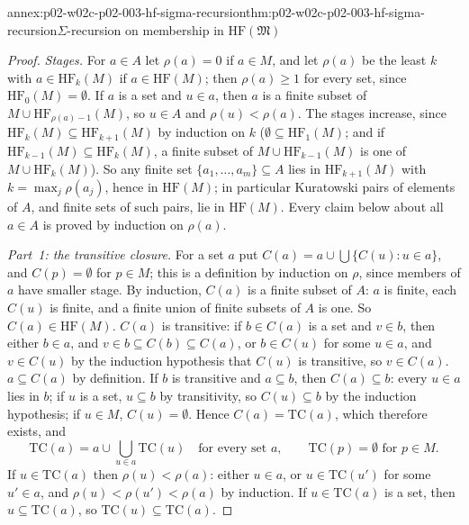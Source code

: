 \begin{annexitem}{annex:p02-w02c-p02-003-hf-sigma-recursion}{thm:p02-w02c-p02-003-hf-sigma-recursion}{\(\Sigma\)-recursion on membership in \(\mathrm{HF}(\mathfrak M)\)}
\begin{proof}
\emph{Stages.}  For \(a\in A\) let \(\rho(a)=0\) if \(a\in M\), and let
\(\rho(a)\) be the least \(k\) with \(a\in\mathrm{HF}_k(M)\) if
\(a\in\mathrm{HF}(M)\); then \(\rho(a)\geq1\) for every set, since
\(\mathrm{HF}_0(M)=\emptyset\).  If \(a\) is a set and \(u\in a\), then
\(a\) is a finite subset of \(M\cup\mathrm{HF}_{\rho(a)-1}(M)\), so
\(u\in A\) and \(\rho(u)<\rho(a)\).  The stages increase, since
\(\mathrm{HF}_k(M)\subseteq\mathrm{HF}_{k+1}(M)\) by induction on \(k\)
(\(\emptyset\subseteq\mathrm{HF}_1(M)\); and if
\(\mathrm{HF}_{k-1}(M)\subseteq\mathrm{HF}_k(M)\), a finite subset of
\(M\cup\mathrm{HF}_{k-1}(M)\) is one of \(M\cup\mathrm{HF}_k(M)\)).  So
any finite set \(\{a_1,\ldots,a_m\}\subseteq A\) lies in
\(\mathrm{HF}_{k+1}(M)\) with \(k=\max_j\rho(a_j)\), hence in
\(\mathrm{HF}(M)\); in particular Kuratowski pairs of elements of \(A\),
and finite sets of such pairs, lie in \(\mathrm{HF}(M)\).  Every claim
below about all \(a\in A\) is proved by induction on \(\rho(a)\).

\emph{Part~1: the transitive closure.}  For a set \(a\) put
\(C(a)=a\cup\bigcup\{C(u):u\in a\}\), and \(C(p)=\emptyset\) for
\(p\in M\); this is a definition by induction on \(\rho\), since members
of \(a\) have smaller stage.  By induction, \(C(a)\) is a finite subset
of \(A\): \(a\) is finite, each \(C(u)\) is finite, and a finite union of
finite subsets of \(A\) is one.  So \(C(a)\in\mathrm{HF}(M)\).  \(C(a)\)
is transitive: if \(b\in C(a)\) is a set and \(v\in b\), then either
\(b\in a\), and \(v\in b\subseteq C(b)\subseteq C(a)\), or \(b\in C(u)\)
for some \(u\in a\), and \(v\in C(u)\) by the induction hypothesis that
\(C(u)\) is transitive, so \(v\in C(a)\).  \(a\subseteq C(a)\) by
definition.  If \(b\) is transitive and \(a\subseteq b\), then
\(C(a)\subseteq b\): every \(u\in a\) lies in \(b\); if \(u\) is a set,
\(u\subseteq b\) by transitivity, so \(C(u)\subseteq b\) by the induction
hypothesis; if \(u\in M\), \(C(u)=\emptyset\).  Hence
\(C(a)=\mathrm{TC}(a)\), which therefore exists, and
\[
 \mathrm{TC}(a)=a\cup\textstyle\bigcup_{u\in a}\mathrm{TC}(u)
 \quad\text{for every set }a,\qquad
 \mathrm{TC}(p)=\emptyset\text{ for }p\in M.\tag{\(\ast\)}
\]
If \(u\in\mathrm{TC}(a)\) then \(\rho(u)<\rho(a)\): either \(u\in a\), or
\(u\in\mathrm{TC}(u')\) for some \(u'\in a\), and \(\rho(u)<\rho(u')<\rho(a)\)
by induction.  If \(u\in\mathrm{TC}(a)\) is a set, then
\(u\subseteq\mathrm{TC}(a)\), so \(\mathrm{TC}(u)\subseteq\mathrm{TC}(a)\).


\end{proof}
\end{annexitem}
